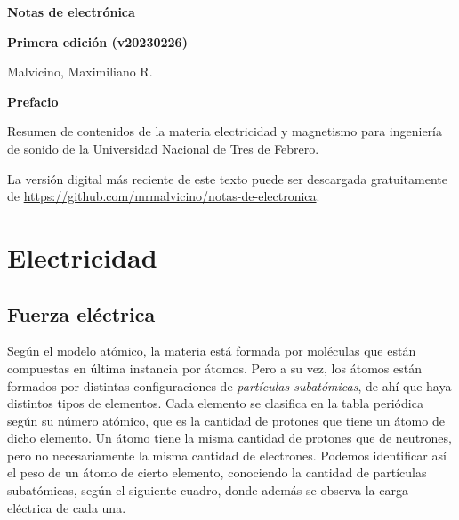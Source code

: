 \documentclass[a5paper,12pt,twoside]{book}
\begin{document}
\pagestyle{fancy}
\fancyhf{}
\chead{\scriptsize \nouppercase\rightmark}
\cfoot{\scriptsize \thepage}
\renewcommand{\headrulewidth}{0pt}

\frontmatter
% 

\begin{center}
    \begin{Huge}
        \textbf{Notas de electrónica}
    \end{Huge}

    \vspace{1cm}
    \textbf{Primera edición (v20230226)}
    \vspace{2cm}

    \begin{Large}
        Malvicino, Maximiliano R.
    \end{Large}
\end{center}

\clearpage
\noindent
\textbf{Prefacio}

Resumen de contenidos de la materia electricidad y magnetismo para ingeniería de sonido de la Universidad Nacional de Tres de Febrero.

La versión digital más reciente de este texto puede ser descargada gratuitamente de \url{https://github.com/mrmalvicino/notas-de-electronica}.

\renewcommand{\spanishappendixname}{Anexo}
\tableofcontents

\mainmatter
{}


\chapter{Electricidad}


\section{Fuerza eléctrica}

Según el modelo atómico, la materia está formada por moléculas que están compuestas en última instancia por átomos.
Pero a su vez, los átomos están formados por distintas configuraciones de \emph{partículas subatómicas}, de ahí que haya distintos tipos de elementos.
Cada elemento se clasifica en la tabla periódica según su número atómico, que es la cantidad de protones que tiene un átomo de dicho elemento.
Un átomo tiene la misma cantidad de protones que de neutrones, pero no necesariamente la misma cantidad de electrones.
Podemos identificar así el peso de un átomo de cierto elemento, conociendo la cantidad de partículas subatómicas, según el siguiente cuadro, donde además se observa la carga eléctrica de cada una.
\end{document}
